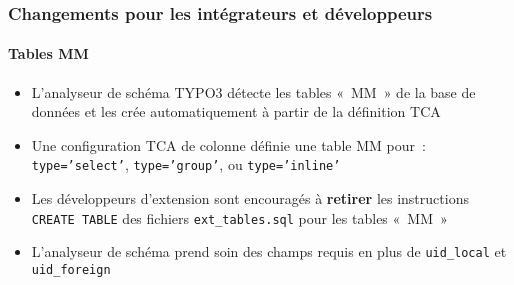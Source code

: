 %

\begin{frame}[fragile]
	\frametitle{Changements pour les intégrateurs et développeurs}
	\framesubtitle{Tables MM}

	\begin{itemize}
		\item L'analyseur de schéma TYPO3 détecte les tables «~MM~» de la base de données et
			les crée automatiquement à partir de la définition TCA
		\item Une configuration TCA de colonne définie une table MM pour~:\newline
			\small\texttt{type='select'}, \texttt{type='group'}, ou \texttt{type='inline'}\normalsize
		\item Les développeurs d'extension sont encouragés à \textbf{retirer} les instructions
			\texttt{CREATE TABLE} des fichiers \texttt{ext\_tables.sql} pour les tables «~MM~»
		\item L'analyseur de schéma prend soin des champs requis en plus de
			\small\texttt{uid\_local} et \texttt{uid\_foreign}\normalsize
	\end{itemize}

\end{frame}

